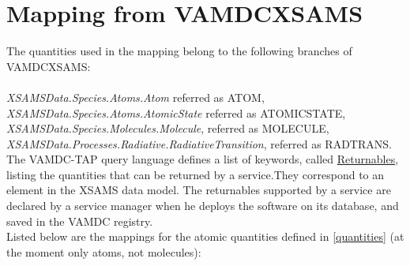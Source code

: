 \documentclass[11pt,a4paper]{ivoa}
\begin{document}



\section{Mapping from VAMDCXSAMS}

The quantities used in the mapping belong to the following branches of VAMDCXSAMS:\\\\
\textit{XSAMSData.Species.Atoms.Atom}  referred as ATOM,\\
\textit{XSAMSData.Species.Atoms.AtomicState}  referred as ATOMICSTATE,\\
\textit{XSAMSData.Species.Molecules.Molecule}, referred as MOLECULE,\\
\textit{XSAMSData.Processes.Radiative.RadiativeTransition}, referred as RADTRANS.\\

The VAMDC-TAP query language defines a list of keywords, called \href{https://standards.vamdc.eu/dictionary/returnables.html}{Returnables}, listing the quantities that can be returned by a service.They correspond to an element in the XSAMS data model. The returnables supported by a service are declared by a service manager when he deploys the software on its database, and saved in the VAMDC registry. \\

Listed below are the mappings for the atomic quantities defined in \ref{quantities} (at the moment only atoms, not molecules):
\end{document}
